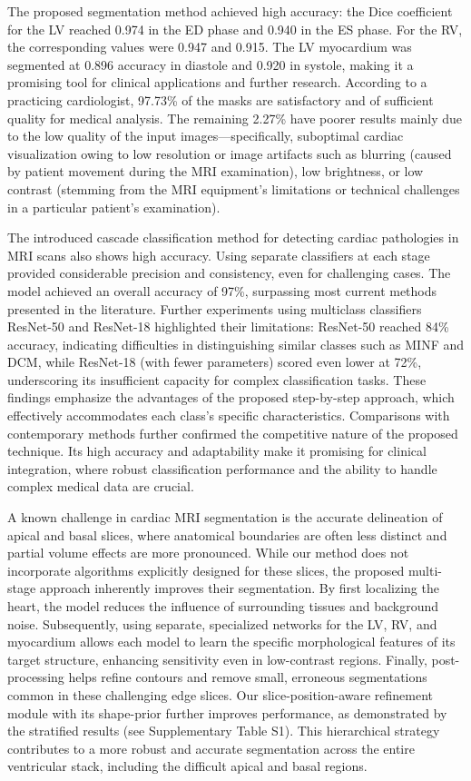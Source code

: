 \documentclass[fleqn,10pt]{wlscirep}
\begin{document}
The proposed segmentation method achieved high accuracy: the Dice coefficient for the LV reached 0.974 in the ED phase and 0.940 in the ES phase. For the RV, the corresponding values were 0.947 and 0.915. The LV myocardium was segmented at 0.896 accuracy in diastole and 0.920 in systole, making it a promising tool for clinical applications and further research. According to a practicing cardiologist, 97.73\% of the masks are satisfactory and of sufficient quality for medical analysis. The remaining 2.27\% have poorer results mainly due to the low quality of the input images---specifically, suboptimal cardiac visualization owing to low resolution or image artifacts such as blurring (caused by patient movement during the MRI examination), low brightness, or low contrast (stemming from the MRI equipment's limitations or technical challenges in a particular patient's examination).

The introduced cascade classification method for detecting cardiac pathologies in MRI scans also shows high accuracy. Using separate classifiers at each stage provided considerable precision and consistency, even for challenging cases. The model achieved an overall accuracy of 97\%, surpassing most current methods presented in the literature. Further experiments using multiclass classifiers ResNet-50 and ResNet-18 highlighted their limitations: ResNet-50 reached 84\% accuracy, indicating difficulties in distinguishing similar classes such as MINF and DCM, while ResNet-18 (with fewer parameters) scored even lower at 72\%, underscoring its insufficient capacity for complex classification tasks. These findings emphasize the advantages of the proposed step-by-step approach, which effectively accommodates each class's specific characteristics. Comparisons with contemporary methods further confirmed the competitive nature of the proposed technique. Its high accuracy and adaptability make it promising for clinical integration, where robust classification performance and the ability to handle complex medical data are crucial.

A known challenge in cardiac MRI segmentation is the accurate delineation of apical and basal slices, where anatomical boundaries are often less distinct and partial volume effects are more pronounced. While our method does not incorporate algorithms explicitly designed for these slices, the proposed multi-stage approach inherently improves their segmentation. By first localizing the heart, the model reduces the influence of surrounding tissues and background noise. Subsequently, using separate, specialized networks for the LV, RV, and myocardium allows each model to learn the specific morphological features of its target structure, enhancing sensitivity even in low-contrast regions. Finally, post-processing helps refine contours and remove small, erroneous segmentations common in these challenging edge slices. Our slice-position-aware refinement module with its shape-prior further improves performance, as demonstrated by the stratified results (see Supplementary Table S1). This hierarchical strategy contributes to a more robust and accurate segmentation across the entire ventricular stack, including the difficult apical and basal regions.
\end{document}
